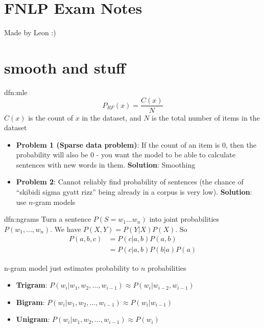 \documentclass[landscape, 8pt]{extarticle}
\begin{document}
\setlength{\abovedisplayskip}{3.5pt}
\setlength{\belowdisplayskip}{3.5pt}
\setlength{\abovedisplayshortskip}{3.5pt}
\setlength{\belowdisplayshortskip}{3.5pt}

\begin{multicols}{3}
\raggedcolumns


\section*{\huge FNLP Exam Notes}
Made by Leon :) 
\vspace{-5pt}
\section{smooth and stuff}

\begin{dfn}{dfn:mle}{}
    \[P_{RF}(x) = \frac{C(x)}{N}\]
    $C(x)$ is the count of $x$ in the dataset, and $N$ is the total number of items in the dataset

    \begin{itemize}[leftmargin=*]
        \setlength\itemsep{0em}
        \item \textbf{Problem 1 (Sparse data problem)}: If the count of an item is $0$, then the probability will also be $0$ - you want the model to be able to calculate sentences with new words in them. \textbf{Solution}: Smoothing
        \item \textbf{Problem 2}: Cannot reliably find probability of sentences (the chance of ``skibidi sigma gyatt rizz'' being already in a corpus is very low). \textbf{Solution}: use $n$-gram models
    \end{itemize}
\end{dfn}

\begin{dfn}{dfn:ngrams}{}
    Turn a sentence $P(S = w_{1}\dots w_{n})$ into joint probabilities $P(w_{1},\dots,w_{n})$. We have $P(X, Y) = P(Y | X)P(X)$. So
    \begin{align*}
        P(a, b, c) &= P(c | a,b)P(a,b)\\
                            &= P(c | a, b)P(b|a)P(a)
    \end{align*}

    n-gram model just estimates probability to $n$ probabilities
    \begin{itemize}[leftmargin=*]
        \setlength\itemsep{0em}
        \item \textbf{Trigram}: $P(w_{i}|w_{1},w_{2},\dots,w_{i-1}) \approx P(w_{i}|w_{i-2}, w_{i-1})$
        \item \textbf{Bigram}: $P(w_{i}|w_{1},w_{2},\dots,w_{i-1}) \approx P(w_{i}|w_{i-1})$
        \item \textbf{Unigram}: $P(w_{i}|w_{1},w_{2},\dots,w_{i-1}) \approx P(w_{i})$
    \end{itemize}


\end{dfn}
\end{multicols}
\end{document}
